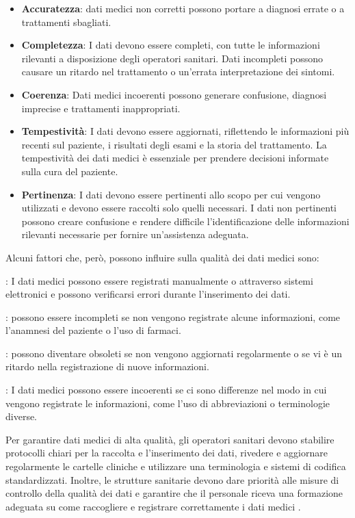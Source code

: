 \begin{itemize}
	 \parsep
	\item\textbf{ Accuratezza}: dati medici non corretti possono portare a diagnosi errate o a trattamenti sbagliati.
	\item \textbf{Completezza}: I dati devono essere completi, con tutte le informazioni rilevanti a disposizione degli operatori sanitari. Dati incompleti possono causare un ritardo nel trattamento o un'errata interpretazione dei sintomi.
	\item\textbf{ Coerenza}: Dati medici incoerenti possono generare confusione, diagnosi imprecise e trattamenti inappropriati.
	\item \textbf{Tempestività}: I dati devono essere aggiornati, riflettendo le informazioni più recenti sul paziente, i risultati degli esami e la storia del trattamento. La tempestività dei dati medici è essenziale per prendere decisioni informate sulla cura del paziente.
	\item \textbf{Pertinenza}: I dati devono essere pertinenti allo scopo per cui vengono utilizzati e devono essere raccolti solo quelli necessari. I dati non pertinenti possono creare confusione e rendere difficile l'identificazione delle informazioni rilevanti necessarie per fornire un'assistenza adeguata.
\end{itemize}

Alcuni fattori che, però, possono influire sulla qualità dei dati medici sono:

\begin{description}
	 \parsep
	\item[Errori di inserimento dei dati]: I dati medici possono essere registrati manualmente o attraverso sistemi elettronici e possono verificarsi errori durante l'inserimento dei dati.
	\item [Dati mancanti]:  possono essere incompleti se non vengono registrate alcune informazioni, come l'anamnesi del paziente o l'uso di farmaci.
	\item [Dati obsoleti]: possono diventare obsoleti se non vengono aggiornati regolarmente o se vi è un ritardo nella registrazione di nuove informazioni.
	\item [Dati incoerenti]: I dati medici possono essere incoerenti se ci sono differenze nel modo in cui vengono registrate le informazioni, come l'uso di abbreviazioni o terminologie diverse.
\end{description}

Per garantire dati medici di alta qualità, gli operatori sanitari devono stabilire protocolli chiari per la raccolta e l'inserimento dei dati, rivedere e aggiornare regolarmente le cartelle cliniche e utilizzare una terminologia e sistemi di codifica standardizzati. Inoltre, le strutture sanitarie devono dare priorità alle misure di controllo della qualità dei dati e garantire che il personale riceva una formazione adeguata su come raccogliere e registrare correttamente i dati medici \cite{chan2010electronic}.

